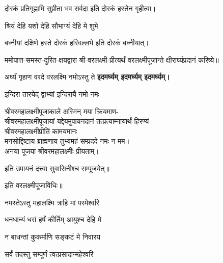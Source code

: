 \begin{center}
{दोरकं प्रतिगृह्णामि सुप्रीता भव सर्वदा}
इति दोरकं हस्तेन गृहीत्वा।

{श्रियं देहि यशो देहि सौभाग्यं देहि मे शुभे}

{बध्नीयां दक्षिणे हस्ते दोरकं हरिवल्लभे}
इति दोरकं बध्नीयात्।


ममोपात्त-समस्त-दुरित-क्षयद्वारा श्री-वरलक्ष्मी-प्रीत्यर्थं वरलक्ष्मीपूजान्ते क्षीरार्घ्यप्रदानं करिष्ये॥

{अर्घ्यं गृहाण वरदे वरलक्ष्मि नमोऽस्तु ते}
\textbf{\devAya{} इदमर्घ्यम् इदमर्घ्यम् इदमर्घ्यम्।}


{इन्दिरा तारयेद् द्वाभ्यां इन्दिरायै नमो नमः}

\hiranyagarbha

श्रीवरमहालक्ष्मीपूजाकाले अस्मिन् मया क्रियमाण-\\
श्रीवरमहालक्ष्मीपूजायां यद्देयमुपायनदानं तत्प्रत्याम्नायार्थं हिरण्यं\\
श्रीवरमहालक्ष्मीप्रीतिं कामयमानः\\
मनसोद्दिष्टाय ब्राह्मणाय तुभ्यमहं सम्प्रददे नमः न मम।\\
अनया पूजया श्रीवरमहालक्ष्मीः प्रीयताम्।

इति उपायनं दत्त्वा सुवासिनीश्च सम्पूजयेत्॥

इति वरलक्ष्मीपूजाविधिः॥

\end{center}


{नमस्तेऽस्तु महालक्ष्मि त्राहि मां परमेश्वरि}

{धनधान्यं धरां हर्षं कीर्तिम् आयुश्च देहि मे}

{न बाधन्तां कुकर्माणि सङ्कटं मे निवारय}

    
    


{सर्वं तदस्तु सम्पूर्णं त्वत्प्रसादान्महेश्वरि}

